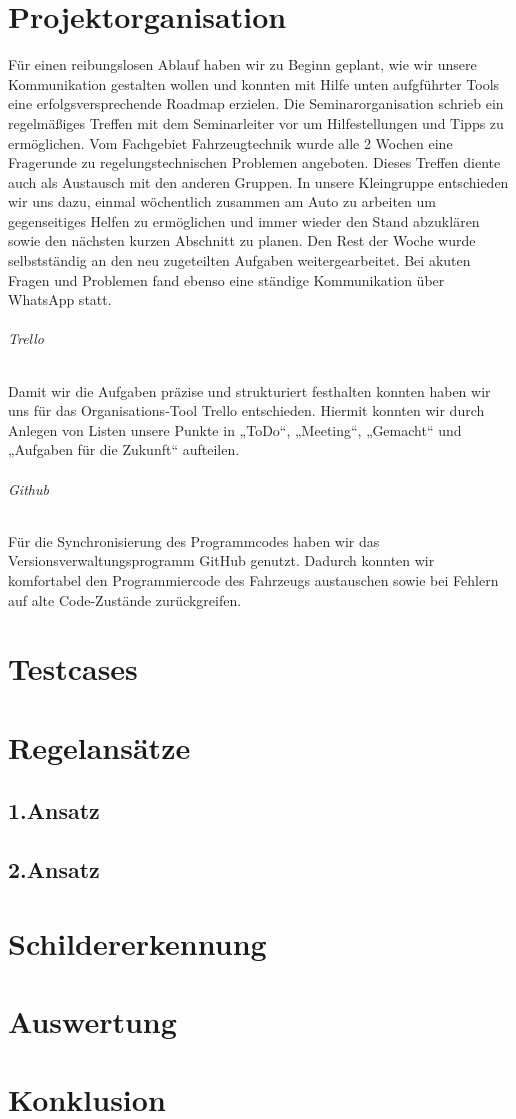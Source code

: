 \documentclass[nochapterpage,bigchapter,linedtoc,longdoc,colorback,accentcolor=tud4c]{tudreport}
\begin{document}
  \chapter{Projektorganisation}
  
  Für einen reibungslosen Ablauf haben wir zu Beginn geplant, wie wir unsere Kommunikation gestalten wollen und konnten mit Hilfe unten aufgführter Tools eine erfolgsversprechende Roadmap erzielen.
  Die Seminarorganisation schrieb ein regelmäßiges Treffen mit dem Seminarleiter vor um Hilfestellungen und Tipps zu ermöglichen. Vom Fachgebiet Fahrzeugtechnik wurde alle 2 Wochen eine Fragerunde zu regelungstechnischen Problemen angeboten. Dieses Treffen diente auch als Austausch mit den anderen Gruppen.
  In unsere Kleingruppe entschieden wir uns dazu, einmal wöchentlich zusammen am Auto zu arbeiten um gegenseitiges Helfen zu ermöglichen und immer wieder den Stand abzuklären sowie den nächsten kurzen Abschnitt zu planen.
  Den Rest der Woche wurde selbstständig an den neu zugeteilten Aufgaben weitergearbeitet.
  Bei akuten Fragen und Problemen fand ebenso eine ständige Kommunikation über WhatsApp statt.
  
  \subparagraph{Trello}
  Damit wir die Aufgaben präzise und strukturiert festhalten konnten haben wir uns für das Organisations-Tool Trello entschieden. Hiermit konnten wir durch Anlegen von Listen unsere Punkte in „ToDo“, „Meeting“, „Gemacht“ und „Aufgaben für die Zukunft“ aufteilen.
  
  \subparagraph{Github}
  Für die Synchronisierung des Programmcodes haben wir das Versionsverwaltungsprogramm GitHub genutzt. Dadurch konnten wir komfortabel den Programmiercode des Fahrzeugs austauschen sowie bei Fehlern auf alte Code-Zustände zurückgreifen.
  
  \chapter{Testcases}
  
  \chapter{Regelansätze}
  
  \section{1.Ansatz}
  
  \section{2.Ansatz}
  
  \chapter{Schildererkennung}
  
  \chapter{Auswertung}
  
  \chapter{Konklusion}
  

  \listoffigures{}
\end{document}
